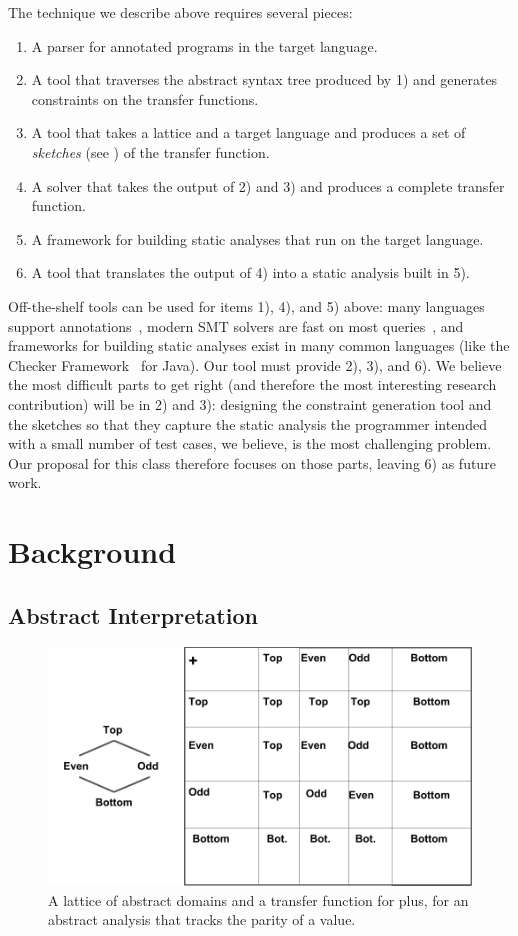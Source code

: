 \documentclass[10pt,conference]{IEEEtran}
\begin{document}
The technique we describe above requires several pieces:
\begin{enumerate}
\item A parser for annotated programs in the target language.
\item A tool that traverses the abstract syntax tree produced by 1) and
generates constraints on the transfer functions.
\item A tool that takes a lattice and a target language and produces
a set of \emph{sketches} (see ) of the transfer function.
\item A solver that takes the output of 2) and 3) and produces
a complete transfer function.
\item A framework for building static analyses that run on the target language.
\item A tool that translates the output of 4) into a static analysis built in
5).
\end{enumerate}

Off-the-shelf tools can be used for items 1), 4), and 5) above: many
languages support annotations~\cite{jsr308},
modern SMT solvers are fast on most queries~\cite{z3},
and frameworks for building static analyses exist in many common languages
(like the Checker Framework~\cite{checker-framework} for Java). Our tool
must provide 2), 3), and 6). We believe the most difficult parts to
get right (and therefore the most interesting research contribution)
will be in 2) and 3): designing the constraint generation tool and the
sketches so that they capture the static analysis the programmer intended
with a small number of test cases, we believe, is the most challenging
problem. Our proposal for this class therefore focuses on those parts,
leaving 6) as future work.

\section{Background}

\subsection{Abstract Interpretation}
\label{sec-ai}

\begin{figure}
 \includegraphics[width=\linewidth]{parity.png}
 \caption{A lattice of abstract domains and a transfer function
   for plus, for an abstract analysis that tracks the parity of
 a value.}
\label{fig-parity}
\end{figure} 
\end{document}
